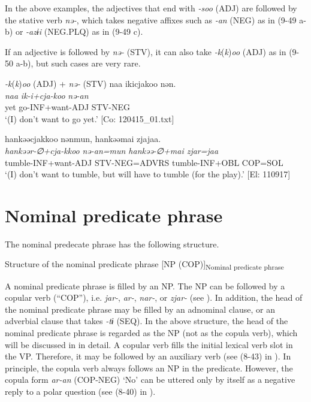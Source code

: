 In the above examples, the adjectives that end with \textit{{}-soo} (ADJ) are followed by the stative verb \textit{nə-}, which takes negative affixes such as \textit{{}-an} (NEG) as in (9-49 a-b) or \textit{{}-azɨi} (NEG.PLQ) as in (9-49 c).

If an adjective is followed by \textit{nə-} (STV), it can also take \textit{{}-k}(\textit{k})\textit{oo} (ADJ) as in (9-50 a-b), but such cases are very rare.

\ea   \textit{{}-k}(\textit{k})\textit{oo} (ADJ) + \textit{nə-} (STV) \label{ex:9.50}
\ea %
 \glll  naa  ikicjakoo  nən.\\
      \textit{naa}  \textit{ik-i+cja-koo}  \textit{nə{}-an}\\
      yet  go-INF+want-ADJ  STV-NEG\\
      \glt       ‘(I) don’t want to go yet.’ [Co: 120415\_01.txt]

\ex \label{ex:9.50b} %
    \glll  hankəəcjakkoo  nənmun,  hankəəmai  zjajaa.\\
      \textit{hankəər-∅+cja-kkoo}  \textit{nə{}-an=mun  hankəə-∅+mai  zjar=jaa}\\
      tumble-INF+want-ADJ  STV-NEG=ADVRS  tumble-INF+OBL  COP=SOL\\
      \glt       ‘(I) don’t want to tumble, but will have to tumble (for the play).’ [El: 110917]
    \z
\z

\section{Nominal predicate phrase}\label{sec:9.3}

The nominal predecate phrase has the following structure.

\ea   Structure of the nominal predicate phrase \label{ex:9.51}
  [NP \hspace{\tabcolsep} (COP)]\textsubscript{Nominal predicate phrase}
\z

A nominal predicate phrase is filled by an NP. The NP can be followed by a copular verb (“COP”), i.e. \textit{jar-}, \textit{ar-}, \textit{nar-}, or \textit{zjar-} (see ). In addition, the head of the nominal predicate phrase may be filled by an adnominal clause, or an adverbial clause that takes \textit{{}-tɨ} (SEQ). In the above structure, the head of the nominal predicate phrase is regarded as the NP (not as the copula verb), which will be discussed in  in detail. A copular verb fills the initial lexical verb slot in the VP. Therefore, it may be followed by an auxiliary verb (see (8-43) in ). In principle, the copula verb always follows an NP in the predicate. However, the copula form \textit{ar-an} (COP-NEG) ‘No’ can be uttered only by itself as a negative reply to a polar question (see (8-40) in ).

